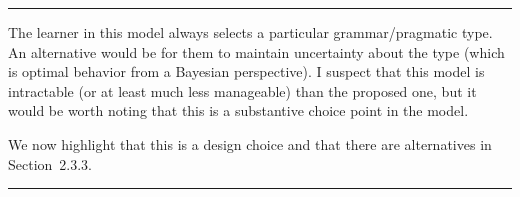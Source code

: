 \documentclass[12pt,a4paper]{article}
\begin{document}
\noindent\rule{\textwidth}{1pt}

\begin{mdframed}[backgroundcolor=gray!25,linecolor=gray!25,frametitle= Reviewer \thereviewerCounter~comment \thereviewerCommentCounter \hfill ~~({\it posterior type sampling})]
%
The learner in this model always selects a particular grammar/pragmatic type. An alternative would be for them to maintain uncertainty about the type (which is optimal behavior from a Bayesian perspective). I suspect that this model is intractable (or at least much less manageable) than the proposed one, but it would be worth noting that this is a substantive choice point in the model.
\end{mdframed}
We now highlight that this is a design choice and that there are alternatives in Section~2.3.3.

\vspace{0.5cm}

\noindent\rule{\textwidth}{1pt}
\end{document}
